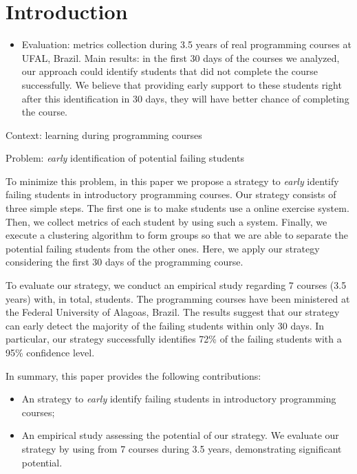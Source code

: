 \section{Introduction}

\begin{itemize}
	
	\item Evaluation: metrics collection during 3.5 years of real programming courses at UFAL, Brazil. Main results: in the first 30 days of the courses we analyzed, our approach could identify students that did not complete the course successfully. We believe that providing early support to these students right after this identification in 30 days, they will have better chance of completing the course.

\end{itemize}

Context: learning during programming courses \todots

Problem: \textit{early} identification of potential failing students \todots

To minimize this problem, in this paper we propose a strategy to \textit{early} identify failing students in introductory programming courses. Our strategy consists of three simple steps. The first one is to make students use a online exercise system. Then, we collect metrics of each student by using such a system. Finally, we execute a clustering algorithm to form groups so that we are able to separate the potential failing students from the other ones. Here, we apply our strategy considering the first 30 days of the programming course.

To evaluate our strategy, we conduct an empirical study regarding 7 courses (3.5 years) with, in total, \totalStudents students. The programming courses have been ministered at the Federal University of Alagoas, Brazil. The results suggest that our strategy can early detect the majority of the failing students within only 30 days. In particular, our strategy successfully identifies 72\% of the failing students with a 95\% confidence level.

In summary, this paper provides the following contributions:

\begin{itemize}

	\item An strategy to \textit{early} identify failing students in introductory programming courses;
	
	\item An empirical study assessing the potential of our strategy. We evaluate our strategy by using \totalStudents from 7 courses during 3.5 years, demonstrating significant potential.

\end{itemize}